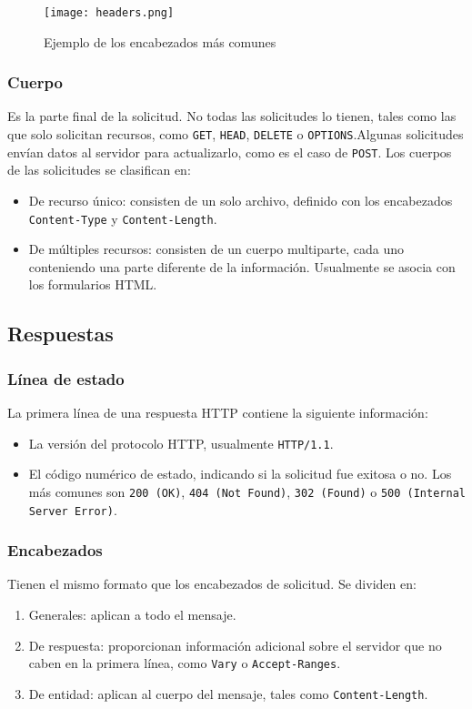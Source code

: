 \documentclass[15pt]{article}
\begin{document}
			\begin{figure}[H]
				\centering
				\texttt{[image: headers.png]}
				\caption{Ejemplo de los encabezados más comunes}
			\end{figure}
			
			\subsubsection{Cuerpo}
			Es la parte final de la solicitud. No todas las solicitudes lo tienen, tales como las que solo solicitan recursos, como \texttt{GET}, \texttt{HEAD}, \texttt{DELETE} o \texttt{OPTIONS}.Algunas solicitudes envían datos al servidor para actualizarlo, como es el caso de \texttt{POST}. Los cuerpos de las solicitudes se clasifican en:
			\begin{itemize}
				\item De recurso único: consisten de un solo archivo, definido con los encabezados \texttt{Content-Type} y \texttt{Content-Length}.
				\item De múltiples recursos: consisten de un cuerpo multiparte, cada uno conteniendo una parte diferente de la información. Usualmente se asocia con los formularios HTML.
			\end{itemize}
			
		\subsection{Respuestas}
			\subsubsection{Línea de estado}
			La primera línea de una respuesta HTTP contiene la siguiente información:
			\begin{itemize}
				\item La versión del protocolo HTTP, usualmente \texttt{HTTP/1.1}.
				\item El código numérico de estado, indicando si la solicitud fue exitosa o no. Los más comunes son \texttt{200 (OK)}, \texttt{404 (Not Found)}, \texttt{302 (Found)} o \texttt{500 (Internal Server Error)}.
			\end{itemize}
			
			\subsubsection{Encabezados}
			Tienen el mismo formato que los encabezados de solicitud. Se dividen en:
			\begin{enumerate}
				\item Generales: aplican a todo el mensaje.
				\item De respuesta: proporcionan información adicional sobre el servidor que no caben en la primera línea, como \texttt{Vary} o \texttt{Accept-Ranges}.
				\item De entidad: aplican al cuerpo del mensaje, tales como \texttt{Content-Length}.
			\end{enumerate}
			
\end{document}

